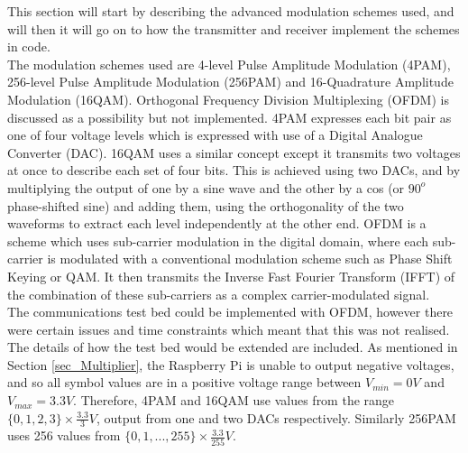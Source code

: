 \documentclass[../main.tex]{subfiles}
\begin{document}

This section will start by describing the advanced modulation schemes used, and will then it will go on to how the transmitter and receiver implement  the schemes in code.\\

The modulation schemes used are 4-level Pulse Amplitude Modulation (4PAM), 256-level Pulse Amplitude Modulation (256PAM) and 16-Quadrature Amplitude Modulation (16QAM).
Orthogonal Frequency Division Multiplexing (OFDM) is discussed as a possibility but not implemented.
4PAM expresses each bit pair as one of four voltage levels which is expressed with use of a Digital Analogue Converter (DAC).
16QAM uses a similar concept except it transmits two voltages at once to describe each set of four bits.
This is achieved using two DACs, and by multiplying the output of one by a sine wave and the other by a cos (or $90^o$ phase-shifted sine) and adding them, using the orthogonality of the two waveforms to extract each level independently at the other end.
OFDM is a scheme which uses sub-carrier modulation in the digital domain, where each sub-carrier is modulated with a conventional modulation scheme such as Phase Shift Keying or QAM.
It then transmits the Inverse Fast Fourier Transform (IFFT) of the combination of these sub-carriers as a complex carrier-modulated signal.\\

The communications test bed could be implemented with OFDM, however there were certain issues and time constraints which meant that this was not realised.
The details of how the test bed would be extended are included.
As mentioned in Section \ref{sec_Multiplier}, the Raspberry Pi is unable to output negative voltages, and so all symbol values are in a positive voltage range between $V_{min} = 0V$ and $V_{max} = 3.3V$.
Therefore, 4PAM and 16QAM use values from the range $\{0, 1, 2, 3\} \times \frac{3.3}{3}V$, output from one and two DACs respectively.
Similarly 256PAM uses 256 values from $\{0, 1, ..., 255\} \times \frac{3.3}{255}V$.\\

\newpage
\end{document}
